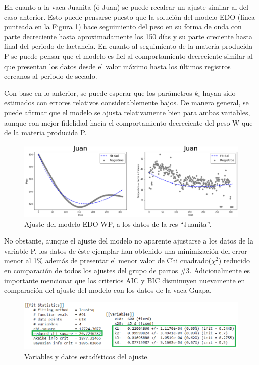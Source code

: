 \begin{itemize}
    En cuanto a la vaca Juanita (ó Juan) se puede recalcar un ajuste similar al del caso anterior. Esto puede pensarse puesto que la solución del modelo EDO (linea punteada en la Figura \ref{ajustemodJuanpng}) hace seguimiento del peso en su forma de onda con parte decreciente hasta aproximadamente los 150 días y su parte creciente hasta final del periodo de lactancia. En cuanto al seguimiento de la materia producida P se puede pensar que el modelo es fiel al comportamiento decreciente similar al que presentan los datos desde el valor máximo hasta los últimos registros cercanos al periodo de secado.
    
    Con base en lo anterior, se puede esperar que los parámetros $k_{i}$ hayan sido estimados con errores relativos considerablemente bajos. De manera general, se puede afirmar  que el modelo se ajusta relativamente bien para ambas variables, aunque con mejor fidelidad hacia el comportamiento decreciente del peso W que de la materia producida P. 
    
    \begin{figure}[H]
            \centering
            \includegraphics[scale=0.49]{img/ajustemodJuan.png}
            \caption{Ajuste del modelo EDO-WP, a los datos de la res ``Juanita''.}
            \label{ajustemodJuanpng}
        \end{figure}
    No obstante, aunque el ajuste del modelo no aparente ajustarse a los datos de la variable P, los datos de éste ejemplar han obtenido una minimización del error menor al 1\% además de presentar el menor valor de Chi cuadrado($\chi^{2}$)  reducido en comparación de todos los ajustes del grupo de partos \#3. Adicionalmente es importante mencionar que los criterios AIC y BIC disminuyen nuevamente en comparación del ajuste del modelo con los datos de la vaca Guapa.

        \begin{figure}[H]
            \centering
            \includegraphics[scale=0.55]{img/ajustemodJuanstats.png}
            \caption{Variables y datos estadísticos del ajuste.}
            \label{ajustemodJuanstatspng}
        \end{figure}


\end{itemize}
